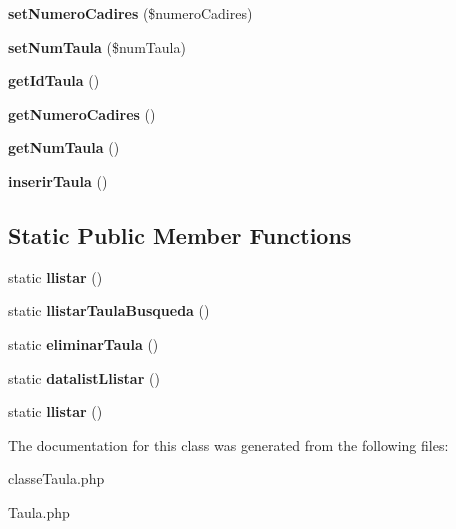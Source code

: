 \begin{DoxyCompactItemize}
\item 
{\bfseries set\+Numero\+Cadires} (\$numero\+Cadires)\hypertarget{classTaula_a71e3995e42b14c8b2da3a8fc2b529203}{}\label{classTaula_a71e3995e42b14c8b2da3a8fc2b529203}

\item 
{\bfseries set\+Num\+Taula} (\$num\+Taula)\hypertarget{classTaula_aebd9a63ca9e6c9b7b79faa070d53a364}{}\label{classTaula_aebd9a63ca9e6c9b7b79faa070d53a364}

\item 
{\bfseries get\+Id\+Taula} ()\hypertarget{classTaula_a4671706f7d7ce5870c13eebf9c29bfe0}{}\label{classTaula_a4671706f7d7ce5870c13eebf9c29bfe0}

\item 
{\bfseries get\+Numero\+Cadires} ()\hypertarget{classTaula_a7f166de0543533fd808e68654b950f94}{}\label{classTaula_a7f166de0543533fd808e68654b950f94}

\item 
{\bfseries get\+Num\+Taula} ()\hypertarget{classTaula_a3b23f2c9d06d22a755bee60b81164f8c}{}\label{classTaula_a3b23f2c9d06d22a755bee60b81164f8c}

\item 
{\bfseries inserir\+Taula} ()\hypertarget{classTaula_a1c8949f1fee098a265f19435a87e4884}{}\label{classTaula_a1c8949f1fee098a265f19435a87e4884}

\end{DoxyCompactItemize}
\subsection*{Static Public Member Functions}
\begin{DoxyCompactItemize}
\item 
static {\bfseries llistar} ()\hypertarget{classTaula_a72f72c95e5ef65375194c5eb823a43e7}{}\label{classTaula_a72f72c95e5ef65375194c5eb823a43e7}

\item 
static {\bfseries llistar\+Taula\+Busqueda} ()\hypertarget{classTaula_a48f60db1ef6e2356455162f652ecc6e4}{}\label{classTaula_a48f60db1ef6e2356455162f652ecc6e4}

\item 
static {\bfseries eliminar\+Taula} ()\hypertarget{classTaula_a5e15fd2121914d87e7fbb08de8a76eba}{}\label{classTaula_a5e15fd2121914d87e7fbb08de8a76eba}

\item 
static {\bfseries datalist\+Llistar} ()\hypertarget{classTaula_a1ebc948b37880b86933f4ecd2bd3effd}{}\label{classTaula_a1ebc948b37880b86933f4ecd2bd3effd}

\item 
static {\bfseries llistar} ()\hypertarget{classTaula_a72f72c95e5ef65375194c5eb823a43e7}{}\label{classTaula_a72f72c95e5ef65375194c5eb823a43e7}

\end{DoxyCompactItemize}


The documentation for this class was generated from the following files\+:\begin{DoxyCompactItemize}
\item 
classe\+Taula.\+php\item 
Taula.\+php\end{DoxyCompactItemize}
